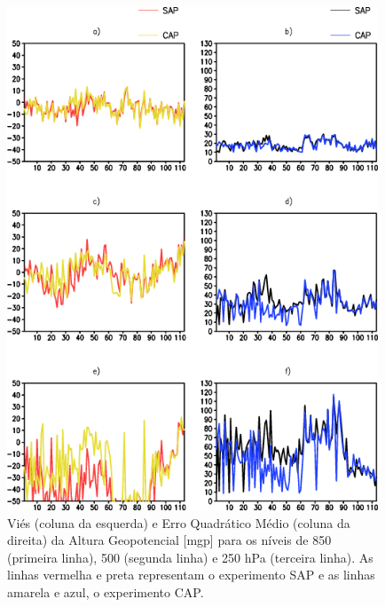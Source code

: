 \begin{figure}[!hbp]
\centering
\includegraphics[height=15cm]{./figs/vies_eqm-zgeo.png}
\caption{Viés (coluna da esquerda) e Erro Quadrático Médio (coluna da direita) da Altura Geopotencial [mgp] para os níveis de 850 (primeira linha), 500 (segunda linha) e 250 hPa (terceira linha). As linhas vermelha e preta representam o experimento SAP e as linhas amarela e azul, o experimento CAP.}
\label{fig43}
\end{figure}

